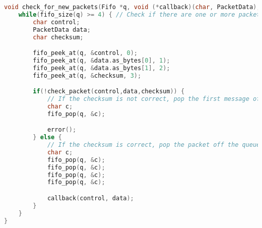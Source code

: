\documentclass{article}
\begin{document}
\begin{lstlisting}[language=C, caption=Protocol]
void check_for_new_packets(Fifo *q, void (*callback)(char, PacketData), void (*error)()){
	while(fifo_size(q) >= 4) { // Check if there are one or more packets in the queue
		char control;
		PacketData data;
		char checksum;

		fifo_peek_at(q, &control, 0);
		fifo_peek_at(q, &data.as_bytes[0], 1);
		fifo_peek_at(q, &data.as_bytes[1], 2);
		fifo_peek_at(q, &checksum, 3);

		if(!check_packet(control,data,checksum)) {
			// If the checksum is not correct, pop the first message off the queue and repeat the loop
			char c;
			fifo_pop(q, &c);

			error();
		} else {
			// If the checksum is correct, pop the packet off the queue and notify a callback
			char c;
			fifo_pop(q, &c);
			fifo_pop(q, &c);
			fifo_pop(q, &c);
			fifo_pop(q, &c);

			callback(control, data);
		}
	}
}
\end{lstlisting}
\end{document}
